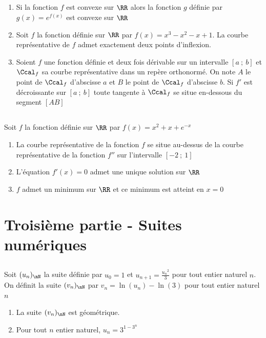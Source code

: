 \documentclass[oneside,12pt]{article}
\begin{document}
\subsection{}
\begin{enumerate}
	\item Si la fonction $f$ est convexe sur $\RR$ alors la fonction $g$ définie par $g(x)=e^{f(x)}$ est convexe sur $\RR$
	\item Soit $f$ la fonction définie sur $\RR$ par $f(x) = x^3-x^2-x+1$. La courbe représentative de $f$ admet exactement deux points d'inflexion.
	\item Soient $f$ une fonction définie et deux fois dérivable sur un intervalle $[a~;~b]$ et $\Ccal_f$ sa courbe représentative dans un repère orthonormé. On note $A$ le point de $\Ccal_f$ d'abscisse $a$ et $B$ le point de $\Ccal_f$ d'abscisse $b$. Si $f'$ est décroissante sur $[a~;~b]$ toute tangente à $\Ccal_f$ se situe en-dessous du segment $[AB]$
\end{enumerate}



\subsection{}
Soit $f$ la fonction définie sur $\RR$ par $f(x)=x^2+x+e^{-x}$
\begin{enumerate}
	\item La courbe représentative de la fonction $f$ se situe au-dessus de la courbe représentative de la fonction $f''$ sur l'intervalle $[-2~;~1]$
	\item L'équation $f'(x)=0$ admet une unique solution sur $\RR$
	\item $f$ admet un minimum sur $\RR$ et ce minimum est atteint en $x=0$
\end{enumerate}



\section*{Troisième partie - Suites numériques}

\subsection{}
Soit $(u_n)_{\nN}$ la suite définie par $u_0=1$ et $u_{n+1}=\frac{{u_n}^2}{3}$ pour tout entier naturel $n$. On définit la suite $(v_n)_{\nN}$ par $v_n=\ln(u_n)-\ln(3)$ pour tout entier naturel $n$
\begin{enumerate}
	\item La suite $(v_n)_{\nN}$ est géométrique.
	\item Pour tout $n$ entier naturel, $u_n=3^{1-3^n}$
\end{enumerate}
\end{document}
